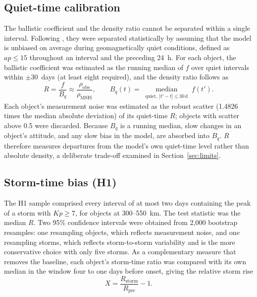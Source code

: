 \documentclass[11pt]{article}
\newcommand{\rhoobs}{\rho_{\mathrm{obs}}}
\newcommand{\rhomsis}{\rho_{\mathrm{MSIS}}}
\newcommand{\Kp}{\mathit{Kp}}
\newcommand{\ap}{\mathit{ap}}
\begin{document}
\subsection{Quiet-time calibration}
The ballistic coefficient and the density ratio cannot be separated within a single interval. Following \citet{doornbos2008}, they were separated statistically by assuming that the model is unbiased on average during geomagnetically quiet conditions, defined as $\ap \leq 15$ throughout an interval and the preceding 24~h. For each object, the ballistic coefficient was estimated as the running median of $f$ over quiet intervals within $\pm 30$~days (at least eight required), and the density ratio follows as
\begin{equation}
R = \frac{f}{B_q}\approx\frac{\rhoobs}{\rhomsis}, \qquad B_q(t) = \operatorname*{median}_{\substack{\text{quiet},\ |t'-t|\leq 30\,\mathrm{d}}} f(t').
\label{eq:R}
\end{equation}
Each object's measurement noise was estimated as the robust scatter (1.4826 times the median absolute deviation) of its quiet-time $R$; objects with scatter above 0.5 were discarded. Because $B_q$ is a running median, slow changes in an object's attitude, and any slow bias in the model, are absorbed into $B_q$. $R$ therefore measures departures from the model's own quiet-time level rather than absolute density, a deliberate trade-off examined in Section~\ref{sec:limits}.

\subsection{Storm-time bias (H1)}
The H1 sample comprised every interval of at most two days containing the peak of a storm with $\Kp \geq 7$, for objects at 300--550~km. The test statistic was the median $R$. Two 95\% confidence intervals were obtained from 2,000 bootstrap resamples: one resampling objects, which reflects measurement noise, and one resampling storms, which reflects storm-to-storm variability and is the more conservative choice with only five storms. As a complementary measure that removes the baseline, each object's storm-time ratio was compared with its own median in the window four to one days before onset, giving the relative storm rise
\begin{equation}
X = \frac{R_{\mathrm{storm}}}{R_{\mathrm{pre}}} - 1 .
\label{eq:X}
\end{equation}
\end{document}
